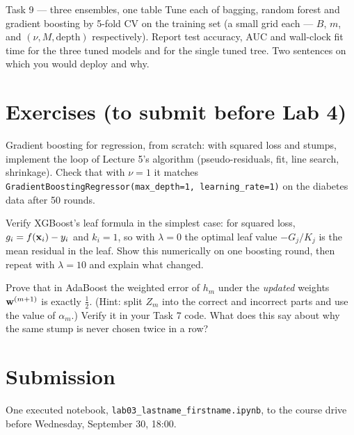 \documentclass[11pt]{article}
\begin{document}
\begin{task}{Task 9 --- three ensembles, one table}
Tune each of bagging, random forest and gradient boosting by 5-fold CV on the training set (a small grid
each --- $B$, $m$, and $(\nu,M,\text{depth})$ respectively). Report test accuracy, AUC and wall-clock fit time
for the three tuned models and for the single tuned tree. Two sentences on which you would deploy and why.
\end{task}

\section{Exercises (to submit before Lab 4)}
\begin{exercise}
Gradient boosting for regression, from scratch: with squared loss and stumps, implement the loop of
Lecture 5's algorithm (pseudo-residuals, fit, line search, shrinkage). Check that with $\nu=1$ it matches
\texttt{GradientBoostingRegressor(max\_depth=1, learning\_rate=1)} on the diabetes data after 50 rounds.
\end{exercise}
\begin{exercise}
Verify XGBoost's leaf formula in the simplest case: for squared loss, $g_i=f(\mathbf{x}_i)-y_i$ and $k_i=1$, so
with $\lambda=0$ the optimal leaf value $-G_j/K_j$ is the mean residual in the leaf. Show this numerically
on one boosting round, then repeat with $\lambda=10$ and explain what changed.
\end{exercise}
\begin{exercise}
Prove that in AdaBoost the weighted error of $h_m$ under the \emph{updated} weights $\mathbf{w}^{(m+1)}$ is exactly
$\tfrac12$. (Hint: split $Z_m$ into the correct and incorrect parts and use the value of $\alpha_m$.)
Verify it in your Task 7 code. What does this say about why the same stump is never chosen twice in a row?
\end{exercise}

\section*{Submission}
One executed notebook, \texttt{lab03\_lastname\_firstname.ipynb}, to the course drive before
Wednesday, September 30, 18:00.
\end{document}
